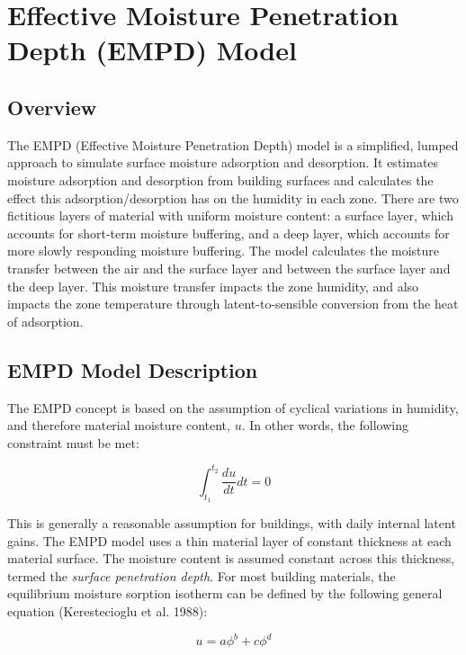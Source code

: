 \section{Effective Moisture Penetration Depth (EMPD) Model}\label{effective-moisture-penetration-depth-empd-model}

\subsection{Overview}\label{overview-014}

The EMPD (Effective Moisture Penetration Depth) model is a simplified, lumped approach to simulate surface moisture adsorption and desorption. It estimates moisture adsorption and desorption from building surfaces and calculates the effect this adsorption/desorption has on the humidity in each zone. There are two fictitious layers of material with uniform moisture content: a surface layer, which accounts for short-term moisture buffering, and a deep layer, which accounts for more slowly responding moisture buffering. The model calculates the moisture transfer between the air and the surface layer and between the surface layer and the deep layer. This moisture transfer impacts the zone humidity, and also impacts the zone temperature through latent-to-sensible conversion from the heat of adsorption.

\subsection{EMPD Model Description}\label{empd-model-description}

The EMPD concept is based on the assumption of cyclical variations in humidity, and therefore material moisture content, $u$. In other words, the following constraint must be met:

\begin{equation}
\int_{{t_1}}^{{t_2}} {\frac{{du}}{{dt }}} dt  = 0
\end{equation}

This is generally a reasonable assumption for buildings, with daily internal latent gains. The EMPD model uses a thin material layer of constant thickness at each material surface. The moisture content is assumed constant across this thickness, termed the \emph{surface penetration depth}. For most building materials, the equilibrium moisture sorption isotherm can be defined by the following general equation (Kerestecioglu et al. 1988):

\begin{equation}
u = a \phi^b + c \phi^d
\end{equation}

